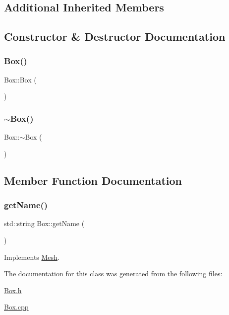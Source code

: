 \subsection*{Additional Inherited Members}


\subsection{Constructor \& Destructor Documentation}
\mbox{\label{class_box_aca78d7db44972bfa78d46b7bbc8796f6}} 
\subsubsection{\texorpdfstring{Box()}{Box()}}
{\footnotesize\ttfamily Box\+::\+Box (\begin{DoxyParamCaption}{ }\end{DoxyParamCaption})}

\mbox{\label{class_box_a6a5e09398e85d602a046b429062fb9c2}} 
\subsubsection{\texorpdfstring{$\sim$Box()}{~Box()}}
{\footnotesize\ttfamily Box\+::$\sim$\+Box (\begin{DoxyParamCaption}{ }\end{DoxyParamCaption})}



\subsection{Member Function Documentation}
\mbox{\label{class_box_ac8792393d053c6cac65a36e5c1f27f15}} 
\subsubsection{\texorpdfstring{getName()}{getName()}}
{\footnotesize\ttfamily std\+::string Box\+::get\+Name (\begin{DoxyParamCaption}{ }\end{DoxyParamCaption})\hspace{0.3cm}{\ttfamily [virtual]}}



Implements \mbox{\hyperlink{class_mesh_aa131fe1c2586fe60988155db77c57272}{Mesh}}.



The documentation for this class was generated from the following files\+:\begin{DoxyCompactItemize}
\item 
\mbox{\hyperlink{_box_8h}{Box.\+h}}\item 
\mbox{\hyperlink{_box_8cpp}{Box.\+cpp}}\end{DoxyCompactItemize}
